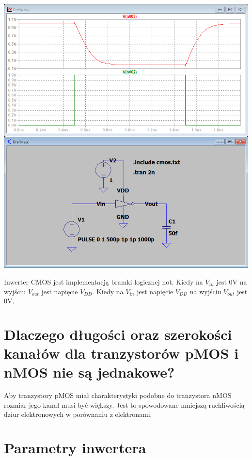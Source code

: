 \documentclass[a4paper, 11pt]{article}
\begin{document}
\begin{center}
	\includegraphics[scale=0.4]{mikro_lab3/Przechwytywanie2.PNG}
\end{center}

Inwerter CMOS jest implementacją bramki logicznej not.
Kiedy na $V_{in}$ jest 0V na wyjściu $V_{out}$ jest napięcie $V_{DD}$.
Kiedy na $V_{in}$ jest napięcie $V_{DD}$ na wyjściu $V_{out}$ jest 0V.

\section{Dlaczego długości oraz szerokości kanałów dla tranzystorów pMOS i nMOS nie są jednakowe?}\label{sec:WL} %

Aby tranzystory pMOS miał charakterystyki podobne do tranzystora nMOS rozmiar jego kanał musi być większy. Jest to spowodowane mniejszą ruchliwością dziur elektronowych w porównaniu z elektronami.


\section{Parametry inwertera}\label{sec:parametry_inwerter} %
\end{document}
